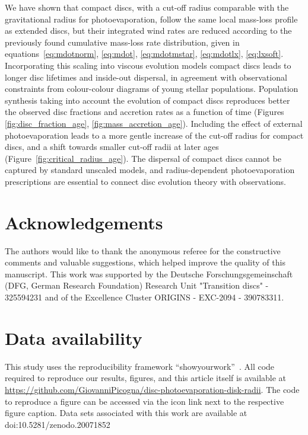 \documentclass[fleqn,usenatbib]{mnras}
\begin{document}
We have shown that compact discs, with a cut-off radius comparable with the gravitational radius for photoevaporation, follow the same local mass-loss profile as extended discs, but their integrated wind rates are reduced according to the previously found cumulative mass-loss rate distribution, given in equations~\ref{eq:mdotnorm}, \ref{eq:mdot},  \ref{eq:mdotmstar}, \ref{eq:mdotlx}, \ref{eq:lxsoft}.
Incorporating this scaling into viscous evolution models compact discs leads to longer disc lifetimes and inside-out dispersal, in agreement with observational constraints from colour-colour diagrams of young stellar populations.
Population synthesis taking into account the evolution of compact discs reproduces better the observed disc fractions and accretion rates as a function of time (Figures \ref{fig:disc_fraction_age}, \ref{fig:mass_accretion_age}).
Including the effect of external photoevaporation leads to a more gentle increase of the cut-off radius for compact discs, and a shift towards smaller cut-off radii at later ages (Figure~\ref{fig:critical_radius_age}).
The dispersal of compact discs cannot be captured by standard unscaled models, and radius-dependent photoevaporation prescriptions are essential to connect disc evolution theory with observations.


\section*{Acknowledgements}

The authors would like to thank the anonymous referee for the constructive comments and valuable suggestions, which helped improve the quality of this manuscript.
This work was supported by the Deutsche Forschungsgemeinschaft (DFG, German Research Foundation) Research Unit "Transition discs" - 325594231 and of the Excellence Cluster ORIGINS - EXC-2094 - 390783311.


\section*{Data availability}
This study uses the reproducibility framework ``showyourwork''~\citep{Luger2021}.
All code required to reproduce our results, figures, and this article itself is available at \url{https://github.com/GiovanniPicogna/disc-photoevaporation-disk-radii}.
The code to reproduce a figure can be accessed via the icon link next to the respective figure caption.
Data sets associated with this work are available at doi:10.5281/zenodo.20071852




\appendix

\bsp	%
\label{lastpage}
\end{document}
